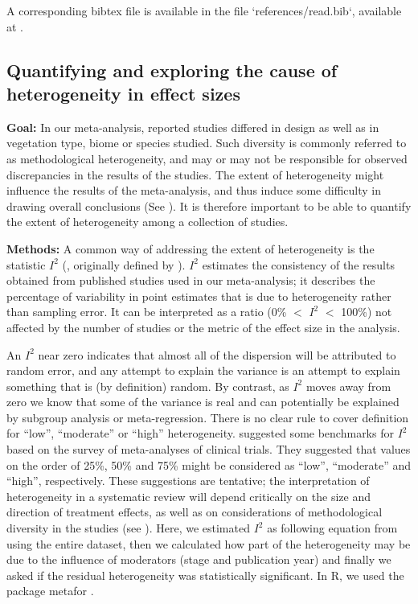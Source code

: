 \documentclass[10pt,twoside]{article}\usepackage[]{graphicx}\usepackage[]{color}
\begin{document}
A corresponding bibtex file is available in the file `references/read.bib`, available at
.

\subsection{Quantifying and exploring the cause of heterogeneity in effect sizes}\label{app:heterogeneity}

\noindent\textbf{Goal:} In our meta-analysis, reported studies differed in design as well as in vegetation type, biome or species studied. Such diversity is commonly referred to as methodological heterogeneity, and may or may not be responsible for observed discrepancies in the results of the studies. The extent of heterogeneity might influence the results of the meta-analysis, and thus induce some difficulty in drawing overall conclusions (See \citealt{Higgins:2002iq}). It is therefore important to be able to quantify the extent of heterogeneity among a collection of studies.

\noindent\textbf{Methods:} A common way of addressing the extent of heterogeneity is the statistic $I^{2}$ (\citealt{Santos:2012gt}, originally defined by \citealt{Higgins:2002iq}). $I^{2}$ estimates the consistency of the results obtained from published studies used in our meta-analysis; it describes the percentage of variability in point estimates that is due to heterogeneity rather than sampling error. It can be interpreted as a ratio (0\% $<$ $I^{2}$ $<$ 100\%) not affected by the number of studies or the metric of the effect size in the analysis.

An $I^{2}$ near zero indicates that almost all of the dispersion will be attributed to random error, and any attempt to explain the variance is an attempt to explain something that is (by definition) random. By contrast, as $I^{2}$ moves away from zero we know that some of the variance is real and can potentially be explained by subgroup analysis or meta-regression.
There is no clear rule to cover definition for ``low'', ``moderate'' or ``high'' heterogeneity. \citealt{Higgins:2003hz} suggested some benchmarks for $I^{2}$ based on the survey of meta-analyses of clinical trials. They suggested that values on the order of 25\%, 50\% and 75\% might be considered as ``low'', ``moderate'' and ``high'', respectively. These suggestions are tentative; the interpretation of heterogeneity in a systematic review will depend critically on the size and direction of treatment effects, as well as on considerations of methodological diversity in the studies (see \citealt{Borenstein:2009um}).
Here, we estimated $I^{2}$ as following equation from \citealt{Higgins:2002iq} using the entire dataset, then we calculated how part of the heterogeneity may be due to the influence of moderators (stage and publication year) and finally we asked if the residual heterogeneity was statistically significant. In R, we used the package metafor  \citep{Viechtbauer-2010}.
\end{document}
